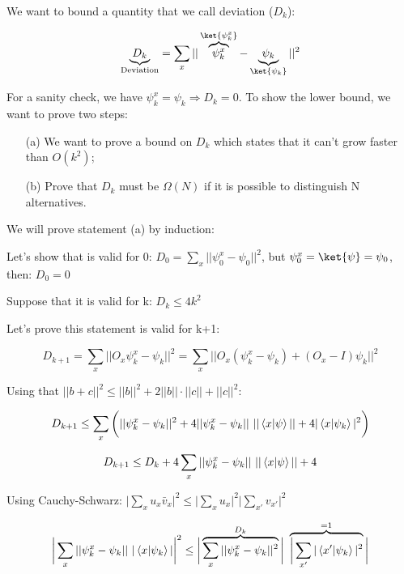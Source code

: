 We want to bound a quantity that we call deviation ($D_k$): 

\begin{equation}
    \underbrace{D_k}_{\mathrm{Deviation}} = \sum_x ||  \overbrace{\psi^x_k}^{\ket{\psi^x_k}}  - \underbrace{\psi_k}_{\ket{\psi_k}} ||^2
\end{equation}

For a sanity check, we have $\psi_k^x = \psi_k \Rightarrow D_k = 0$. To show the lower bound, we want to prove two steps:

\begin{itemize}
    \item[(a)] We want to prove a bound on $D_k$ which states that it can't grow faster than $O(k^2)$;
    \item[(b)] Prove that $D_k$ must be $\Omega(N)$ if it is possible to distinguish N alternatives.
\end{itemize}

We will prove statement (a) by induction:

Let's show that is valid for 0: $D_0 = \sum_x || \psi_0^x - \psi_0||^2$, but $\psi_0^x = \ket{\psi} = \psi_0$, then: $D_0 = 0$

Suppose that it is valid for k: $D_k \leq 4 k^2$

Let's prove this statement is valid for k+1:

\begin{equation}
    D_{k+1} = \sum_x || O_x \psi_k^x - \psi_k ||^2
    = \sum_x || O_x ( \psi_k^x - \psi_k) + (O_x - I) \psi_k||^2
\end{equation}

Using that $|| b + c ||^2 \leq ||b||^2 + 2||b|| \cdot ||c|| + ||c||^2$:

\begin{equation}
    D_{k+1} \leq \sum_x \bigg( || \psi_k^x - \psi_k||^2 + 4 || \psi_k^x - \psi_k|| \ || \left\langle{x}\middle\vert{\psi}\right\rangle || + 4 |\left\langle{x}\middle\vert{\psi_k}\right\rangle|^2 \bigg)
\end{equation}

\begin{equation}
    \label{Eq: D_k+1}
    D_{k+1} \leq D_k + 4 \sum_x || \psi_k^x - \psi_k||\ || \left\langle{x}\middle\vert{\psi}\right\rangle || + 4
\end{equation}


Using Cauchy-Schwarz: $\big|\sum_x u_x \bar{v}_x \big|^2 \leq \big|\sum_x u_x \big|^2 \big|\sum_{x'} v_{x'} \big|^2 $

\begin{equation}
    \bigg|\sum_x || \psi_k^x - \psi_k||\ |\ip{x}{\psi_k}|\bigg|^2 \leq \bigg|\overbrace{\sum_x || \psi_k^x - \psi_k||^2 }^{D_k}\bigg|\ \overbrace{\bigg|\sum_{x'} |\ip{x'}{\psi_k}|^2}^{=1} \bigg| 
\end{equation}

